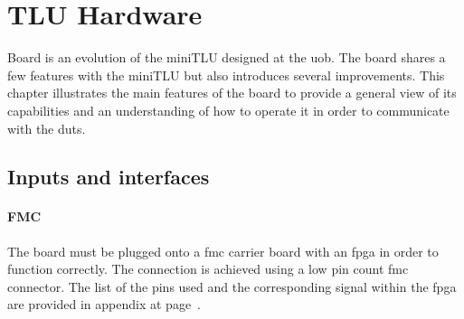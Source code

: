 \chapter{TLU Hardware}\label{ch:hardware}
Board \brd is an evolution of the miniTLU designed at the \gls{uob}. The board shares a few features with the miniTLU but also introduces several improvements. This chapter illustrates the main features of the board to provide a general view of its capabilities and an understanding of how to operate it in order to communicate with the \gls{dut}s.

\section{Inputs and interfaces}\label{ch:hwDUT}
\subsubsection{FMC}
The board must be plugged onto a \gls{fmc} carrier board with an \gls{fpga} in order to function correctly. The connection is achieved using a low pin count \gls{fmc} connector. The list of the pins used and the corresponding signal within the \gls{fpga} are provided in appendix at page~\pageref{ch:appendix}.\\

